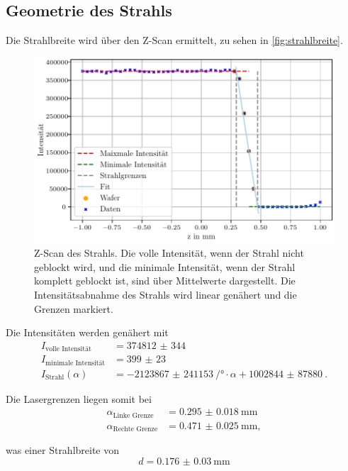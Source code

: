 \subsection{Geometrie des Strahls}

Die Strahlbreite wird über den Z-Scan ermittelt, zu sehen in \autoref{fig:strahlbreite}.

\begin{figure}[H]
    \centering
    \includegraphics[width=\textwidth]{plots/zscan.pdf}
    \caption{Z-Scan des Strahls. Die volle Intensität, wenn der Strahl nicht geblockt wird, und die minimale Intensität, wenn der Strahl komplett geblockt ist, sind über Mittelwerte dargestellt.
    Die Intensitätsabnahme des Strahls wird linear genähert und die Grenzen markiert.}
    \label{fig:strahlbreite}
\end{figure}

Die Intensitäten werden genähert mit
\begin{align*}
    I_\text{volle Intensität} &= \qty{374812(344)}{} \\
    I_\text{minimale Intensität} &= \qty{399(23)}{} \\
    I_\text{Strahl}(\alpha) &= \qty{-2123867(241153)}{\per\degree} \cdot \alpha + \qty{1002844(87880)}{}.
\end{align*}

Die Lasergrenzen liegen somit bei
\begin{align*}
    \alpha_\text{Linke Grenze} &= \qty{0.295(18)}{\milli\meter} \\
    \alpha_\text{Rechte Grenze} &= \qty{0.471(25)}{\milli\meter},
\end{align*}

was einer Strahlbreite von 
\begin{equation*}
    d = \qty{0.176(30)}{\milli\meter}
\end{equation*}

